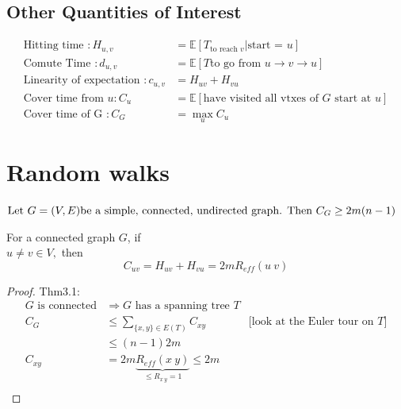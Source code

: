 \documentclass[12pt]{article}
\begin{document}
\subsection{Other Quantities of Interest}
\begin{align*}
\text{Hitting time } :H_{u,v} &= \mathbb{E}[T_{\text{to reach } v}|\text{start = }u]\\
\text{Comute Time }: d_{u,v}& = \mathbb{E}[T \text{to go from } u\to v \to u]\\
\text{Linearity of expectation }: c_{u,v} &= H_{uv} + H_{vu}\\
\text{Cover time from }u: C_u&=\mathbb{E}[\text{have visited all vtxes of $G$ start at $u$}]\\
\text{Cover time of G }: C_G &= \max_u C_u
\end{align*}
\section{Random walks}
\begin{theorem}[]
	$\text{Let } G = (V, E) \text{be a simple, connected, undirected graph. }\\
	\text{Then }C_G \geq 2m(n-1)\\$
\end{theorem}
\begin{theorem}[]
	For a connected graph $G$, if\\
	$u \neq v \in V,$ then\\
	$$C_{uv} = H_{uv} + H_{vu} = 2m R_{eff} (u~v)$$
\end{theorem}
\begin{proof}
	Thm3.1:
	\begin{align*}
	\text{$G$ is connected} &\Rightarrow G \text{ has a spanning tree $T$}\\
	C_G &\leq \sum_{\{x,y\} \in E(T)} C_{xy} &\text{[look at the Euler tour on $T$]}\\
	& \leq (n-1)2m \\
	C_{xy} &= 2m\underbrace{R_{eff}(x~y)}_{\leq R_{x~y} = 1} \leq 2m\\
	\end{align*}
\end{proof}
\end{document}
